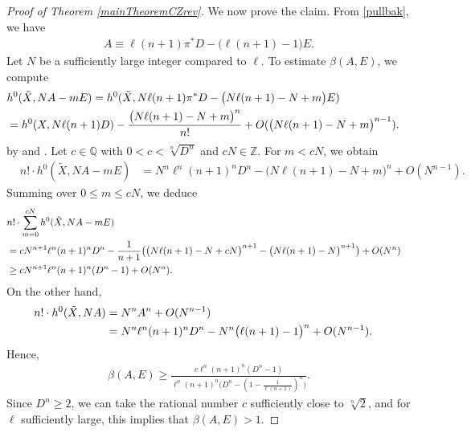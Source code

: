 \documentclass[10pt]{amsart}
\numberwithin{equation}{section}
\theoremstyle{plain}
\theoremstyle{definition}
\begin{document}
\begin{proof}[Proof of Theorem \ref{mainTheoremCZrev}]
We now prove the claim.
From \eqref{pullbak}, we have 
\begin{align}\label{NA}
 A\equiv  \ell (n+1)\pi^*D-\big( \ell (n+1)- 1\big)E.
\end{align}
Let $N$ be a sufficiently large integer compared to $\ell$.
To estimate $\beta(A,E)$, we  compute
\begin{align*}
&h^0(\tilde X,NA-mE)=h^0(\tilde X,N\ell (n+1)\pi^*D-\big(N\ell (n+1)-N+m\big)E)\cr
&= h^0( X,N\ell (n+1)D)-\frac{\big(N\ell (n+1)-N+m\big)^n}{n!}+O(\big(N\ell (n+1)-N+m\big)^{n-1}).
\end{align*}
by \cite[Corollary  6.9]{Voj2023} and \cite[Lemma 3.10]{HLX}.  
Let $c\in \mathbb Q$ with $0<c<\sqrt[n]{D^n}$ and $cN\in\mathbb Z$.
For $m<cN$, we obtain
\begin{align*}
&n!\cdot  h^0(\tilde X,NA-mE) 
&= N^n\ell^n (n+1)^nD^n- \big(N\ell (n+1)-N+m\big)^n +O(N^{n-1}). 
\end{align*}
Summing over $0\le m\le cN$, we deduce
\begin{align*}
&n!\cdot \sum_{m=0}^{cN} h^0(\tilde X,NA-mE) \cr
&= cN^{n+1}\ell^n (n+1)^nD^n- \frac{1}{n+1}\big(\big(N\ell (n+1)-N+cN\big)^{n+1}-\big(N\ell (n+1)-N\big)^{n+1}\big) +O(N^{n }) \cr
&  \geq cN^{n+1}\ell^n (n+1)^n(D^n-1)+O(N^{n}).
\end{align*}
On the other hand,
 \begin{align}\label{h0NA}
n!\cdot  h^0(\tilde X,NA)&=N^nA^n+O(N^{n-1})\cr
&=N^n\ell^n (n+1)^nD^n-N^n\big( \ell (n+1)- 1\big)^{n} +O(N^{n-1}).
\end{align}
Hence, 
 \begin{align*}
\beta(A,E)\ge \frac{c \ell^n (n+1)^n(D^n-1)}{\ell^n (n+1)^n\big(D^n- (1-\frac{1}{\ell (n+1)})^n\big)}.
\end{align*}
 Since $D^n\ge 2$, we can take the rational number $c$ sufficiently close to $\sqrt[n]{2}$, and for $\ell$ sufficiently large, this implies that  $
\beta(A,E)>1.$


\end{proof}
\end{document}
